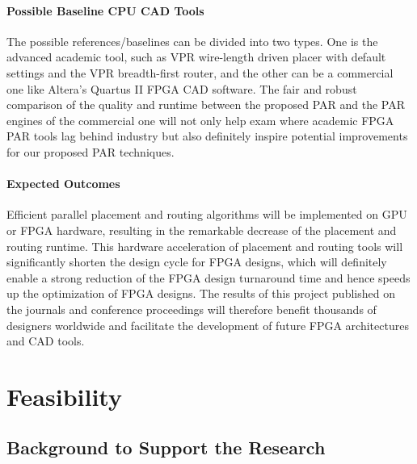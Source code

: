 \documentclass[a4paper,oneside,12pt]{article}
\begin{document}
\paragraph{Possible Baseline CPU CAD Tools}
The possible references/baselines can be divided into two types. One is the advanced academic tool, such as VPR wire-length driven placer with default settings and the VPR breadth-first router, and the other can be a commercial one like Altera's Quartus II FPGA CAD software.
The fair and robust comparison of the quality and runtime between the proposed PAR and the PAR engines of the commercial one will not only help exam where academic FPGA PAR tools lag behind industry but also definitely inspire potential improvements for our proposed PAR techniques.

\paragraph{Expected Outcomes}
Efficient parallel placement and routing algorithms will be implemented on GPU or FPGA hardware, resulting in the remarkable decrease of the placement and routing runtime. This hardware acceleration of placement and routing tools will significantly shorten the design cycle for FPGA designs, which will definitely enable a strong reduction of the FPGA design turnaround time and hence speeds up the optimization of FPGA designs. The results of this project published on the journals and conference proceedings will therefore benefit thousands of designers worldwide and facilitate the development of future FPGA architectures and CAD tools.

\section{Feasibility}


\subsection{Background to Support the Research}
\end{document}
